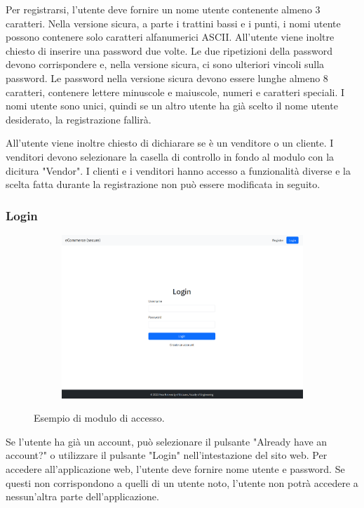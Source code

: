 \documentclass[conference,onecolumn,a4paper]{IEEEtran}
\begin{document}
Per registrarsi, l'utente deve fornire un nome utente contenente almeno 3 caratteri. Nella versione sicura, a parte i trattini bassi e i punti, i nomi utente possono contenere solo caratteri alfanumerici ASCII. All'utente viene inoltre chiesto di inserire una password due volte. Le due ripetizioni della password devono corrispondere e, nella versione sicura, ci sono ulteriori vincoli sulla password. Le password nella versione sicura devono essere lunghe almeno 8 caratteri, contenere lettere minuscole e maiuscole, numeri e caratteri speciali. I nomi utente sono unici, quindi se un altro utente ha già scelto il nome utente desiderato, la registrazione fallirà.

All'utente viene inoltre chiesto di dichiarare se è un venditore o un cliente. I venditori devono selezionare la casella di controllo in fondo al modulo con la dicitura "Vendor". I clienti e i venditori hanno accesso a funzionalità diverse e la scelta fatta durante la registrazione non può essere modificata in seguito.

\subsubsection{Login}

\begin{figure}[H]
    \centering
    \begin{subfigure}[b]{0.4\linewidth}
        \includegraphics[width=\linewidth]{resources/login.png}
    \end{subfigure}
    \caption{Esempio di modulo di accesso.}
\end{figure}

Se l'utente ha già un account, può selezionare il pulsante "Already have an account?" o utilizzare il pulsante "Login" nell'intestazione del sito web. Per accedere all'applicazione web, l'utente deve fornire nome utente e password. Se questi non corrispondono a quelli di un utente noto, l'utente non potrà accedere a nessun'altra parte dell'applicazione.
\end{document}
